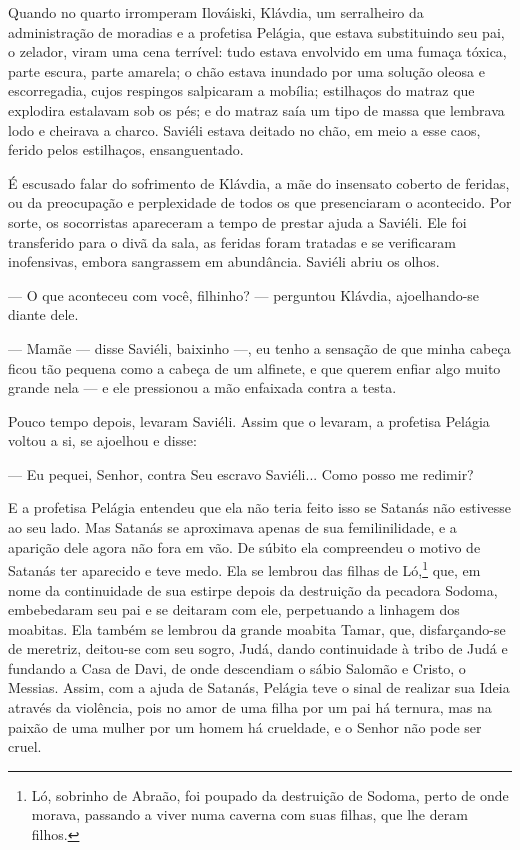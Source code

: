 Quando no quarto irromperam Ilováiski, Klávdia, um serralheiro da
administração de moradias e a profetisa Pelágia, que estava substituindo
seu pai, o zelador, viram uma cena terrível: tudo estava envolvido em
uma fumaça tóxica, parte escura, parte amarela; o chão estava inundado
por uma solução oleosa e escorregadia, cujos respingos salpicaram a
mobília; estilhaços do matraz que explodira estalavam sob os pés; e do
matraz saía um tipo de massa que lembrava lodo e cheirava a charco.
Saviéli estava deitado no chão, em meio a esse caos, ferido pelos
estilhaços, ensanguentado.

É escusado falar do sofrimento de Klávdia, a mãe do insensato coberto de
feridas, ou da preocupação e perplexidade de todos os que presenciaram o
acontecido. Por sorte, os socorristas apareceram a tempo de prestar
ajuda a Saviéli. Ele foi transferido para o divã da sala, as feridas
foram tratadas e se verificaram inofensivas, embora sangrassem em
abundância. Saviéli abriu os olhos.

--- O que aconteceu com você, filhinho? --- perguntou Klávdia,
ajoelhando-se diante dele.

--- Mamãe --- disse Saviéli, baixinho ---, eu tenho a sensação de que
minha cabeça ficou tão pequena como a cabeça de um alfinete, e que
querem enfiar algo muito grande nela --- e ele pressionou a mão
enfaixada contra a testa.

Pouco tempo depois, levaram Saviéli. Assim que o levaram, a profetisa
Pelágia voltou a si, se ajoelhou e disse:

--- Eu pequei, Senhor, contra Seu escravo Saviéli... Como posso me
redimir?

E a profetisa Pelágia entendeu que ela não teria feito isso se Satanás
não estivesse ao seu lado. Mas Satanás se aproximava apenas de sua
femilinilidade, e a aparição dele agora não fora em vão. De súbito ela
compreendeu o motivo de Satanás ter aparecido e teve medo. Ela se
lembrou das filhas de Ló,\footnote{Ló, sobrinho de Abraão, foi poupado
  da destruição de Sodoma, perto de onde morava, passando a viver numa
  caverna com suas filhas, que lhe deram filhos.} que, em nome da
continuidade de sua estirpe depois da destruição da pecadora Sodoma,
embebedaram seu pai e se deitaram com ele, perpetuando a linhagem dos
moabitas. Ela também se lembrou dа grande moabita Tamar, que,
disfarçando-se de meretriz, deitou-se com seu sogro, Judá, dando
continuidade à tribo de Judá e fundando a Casa de Davi, de onde
descendiam o sábio Salomão e Cristo, o Messias. Assim, com a ajuda de
Satanás, Pelágia teve o sinal de realizar sua Ideia através da
violência, pois no amor de uma filha por um pai há ternura, mas na
paixão de uma mulher por um homem há crueldade, e o Senhor não pode ser
cruel.

